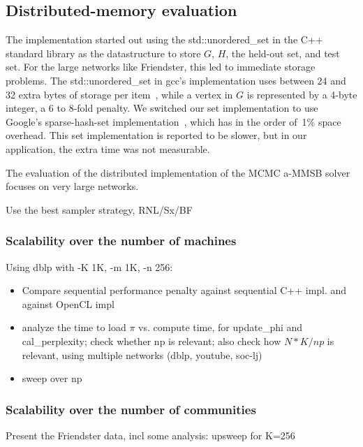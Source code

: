 \begin{comment}
3. evaluation
   - do we speak again about sampler strategies? no need, I think, or a
     one-liner that we use the best strategy from above, and did very short
     evaluation with large data set
   - measurements:
     + Friendster:
       - sweep over K and discuss
     + dblp???? soc-lj????
       - sweep over K and discuss
       - sweep over np and discuss
   - discuss time breakdown (need some terminated runs):
     + dblp
     + Friendster
     points to discuss:
     + update phi: compute time vs memory access time
     + update pi: idem, compare to update phi
     + update beta: idem, compare to update phi
     + perplexity: idem, compare to update phi

\end{comment}

\subsection{Distributed-memory evaluation}

The implementation started out using the std::unordered\_set in the C++
standard library as the datastructure to store $G$, $H$, the held-out set,
and test set. For the large networks like Friendster, this led to immediate
storage problems. The std::unordered\_set in gcc's implementation uses
between 24 and 32 extra bytes of storage per item~\cite{g++ unordered_set
memory overhead}, while a vertex in $G$ is represented by a 4-byte integer,
a 6 to 8-fold penalty. We switched our set implementation to use Google's
sparse-hash-set implementation~\cite{google-sparse-hash}, which has in the
order of~1\% space overhead. This set implementation is reported to be slower,
but in our application, the extra time was not measurable.

The evaluation of the distributed implementation of the MCMC a-MMSB solver
focuses on very large networks.

Use the best sampler strategy, RNL/Sx/BF

\subsubsection{Scalability over the number of machines}

Using dblp with -K 1K, -m 1K, -n 256:
\begin{itemize}
\item Compare sequential performance penalty against sequential C++ impl. and
	against OpenCL impl
\item analyze the time to load $\pi$ vs. compute time, for update\_phi and
	cal\_perplexity; check whether np is relevant; also check how $N*K/np$
	is relevant, using multiple networks (dblp, youtube, soc-lj)
\item sweep over np
\end{itemize}

\subsubsection{Scalability over the number of communities}

Present the Friendster data, incl some analysis: upsweep for K=256
